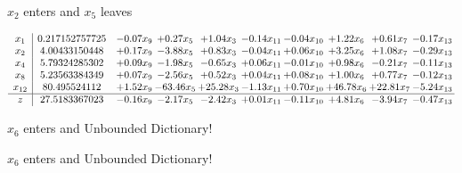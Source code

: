 \documentclass[9pt]{article}
\begin{document}
 $ x_{2} $ enters and $ x_{5} $ leaves 

 \[\begin{array}{c| c c@{\hskip 2pt} c@{\hskip 2pt} c@{\hskip 2pt} c@{\hskip 2pt} c@{\hskip 2pt} c@{\hskip 2pt} c@{\hskip 2pt} c@{\hskip 2pt} }
 x_{1}   &  0.217152757725 & -0.07 x_{9} & +  0.27 x_{5} & +  1.04 x_{3} & -0.14 x_{11} & -0.04 x_{10} & +  1.22 x_{6} & +  0.61 x_{7} & -0.17 x_{13}\\
 x_{2}   &  4.00433150448 & +  0.17 x_{9} & -3.88 x_{5} & +  0.83 x_{3} & -0.04 x_{11} & +  0.06 x_{10} & +  3.25 x_{6} & +  1.08 x_{7} & -0.29 x_{13}\\
 x_{4}   &  5.79324285302 & +  0.09 x_{9} & -1.98 x_{5} & -0.65 x_{3} & +  0.06 x_{11} & -0.01 x_{10} & +  0.98 x_{6} & -0.21 x_{7} & -0.11 x_{13}\\
 x_{8}   &  5.23563384349 & +  0.07 x_{9} & -2.56 x_{5} & +  0.52 x_{3} & +  0.04 x_{11} & +  0.08 x_{10} & +  1.00 x_{6} & +  0.77 x_{7} & -0.12 x_{13}\\
 x_{12}   &  80.495524112 & +  1.52 x_{9} & -63.46 x_{5} & + 25.28 x_{3} & -1.13 x_{11} & +  0.70 x_{10} & + 46.78 x_{6} & + 22.81 x_{7} & -5.24 x_{13}\\
\hline
z    &  27.5183367023 & -0.16 x_{9} & -2.17 x_{5} & -2.42 x_{3} & +  0.01 x_{11} & -0.11 x_{10} & +  4.81 x_{6} & -3.94 x_{7} & -0.47 x_{13}\\
\end{array}\]


 $ x_{6} $ enters and Unbounded Dictionary!


 $ x_{6} $ enters and Unbounded Dictionary!
\end{document}
